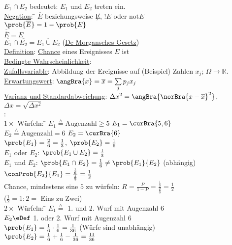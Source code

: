 \begin{tabbing}
$E_1 \cap E_2$ bedeutet: \> $E_1$ und $E_2$ treten ein.\\
\underline{Negation}: \= $\overline{E}$ beziehungsweise $\not E$, $!E$ oder $\text{not} E$\\
\> $\prob{\overline{E}} = 1 - \prob{E}$\\
\> $\overline{\overline{E}} = E$\\
\> $\overline{E_1} \cap \overline{E_2} = \overline{E_1 \cup E_2}$ (\underline{De Morgansches Gesetz})\\
\underline{Definition}: \underline{Chance} eines Ereignisses $E$ ist \\
\underline{Bedingte Wahrscheinlichkeit}: \\
\underline{Zufallsvariable}: Abbildung der Ereignisse auf (Beispiel) Zahlen $x_j$; $\Omega \to \mathds{R}$.\\
\underline{Erwartungswert}: $\angBra{x} = \overline{x} = \sum\limits_j p_j x_j$\\
\underline{Varianz und Standardabweichung}: $\Delta x^2 = \angBra{\norBra{x - \overline{x}}^2}$, $\Delta x = \sqrt{\Delta x^2}$\\
:\\
$1\times$ Würfeln: \= $E_1 \stackrel{\wedge}{=} \text{Augenzahl} \geq 5$ \quad $E_1 = \curBra{5,6}$\\
\> $E_2 \stackrel{\wedge}{=} \text{Augenzahl} = 6$ \quad $E_2 = \curBra{6}$\\
\> $\prob{E_1} = \frac26 = \frac13$, $\prob{E_2} = \frac16$\\
\> $E_1$ oder $E_2$: $\prob{E_1\cup E_2} = \frac13$\\
\> $E_1$ und $E_2$: $\prob{E_1 \cap E_2} = \frac16 \neq \prob{E_1}{E_2}$ (abhängig)\\
\> $\conProb{E_2}{E_1} = \frac{\frac16}{\frac13} =  \frac12$\\
\> Chance, mindestens eine $5$ zu würfeln: $R = \frac{P}{1 - P} = \frac{\frac13}{\frac23} = \frac12$\\
\> ($\frac12 = 1:2 =$ Eins zu Zwei)\\
$2\times$ Würfeln: \= $E_1 \stackrel{\wedge}{=}$ 1. und 2. Wurf mit Augenzahl $6$\\
\> $E_2 \eDef$ 1. oder 2. Wurf mit Augenzahl $6$\\
\> $\prob{E_1} = \frac16\cdot\frac16 = \frac1{36}$ (Würfe sind unabhängig)\\
\> $\prob{E_2} = \frac16 + \frac16 - \frac1{36} = \frac{11}{36}$
\end{tabbing}

